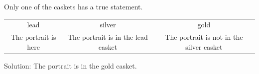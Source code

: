 Only one of the caskets has a true statement.
\begin{tabular}{ccc}
\toprule
lead & silver & gold\\
The portrait is here & The portrait is in the lead casket & The portrait is not in the silver casket\\
\bottomrule
\end{tabular}
Solution: The portrait is in the gold casket.